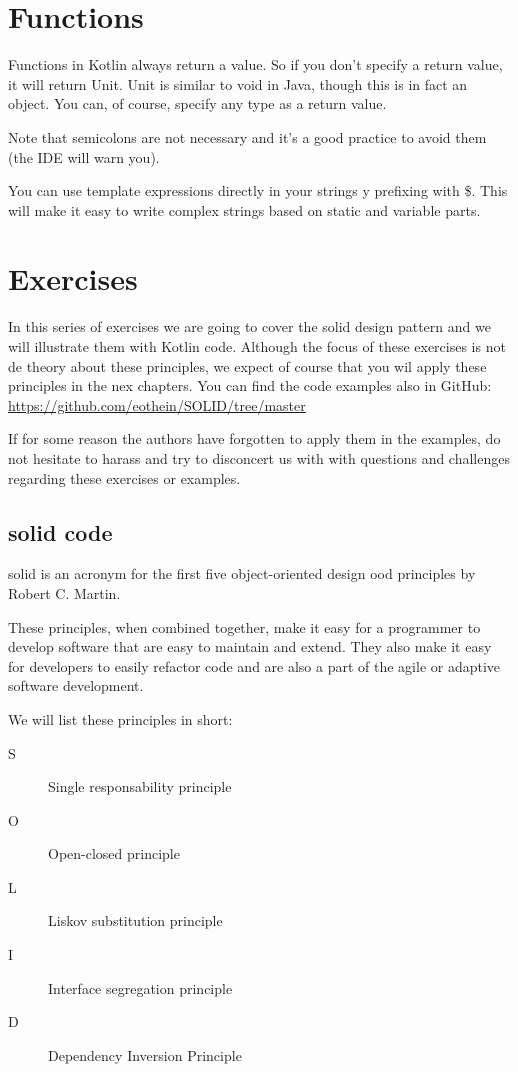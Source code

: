 \section{Functions}
Functions in Kotlin always return a value. So if you don’t specify a return value, it will return Unit.
Unit is similar to void in Java, though this is in fact an object. You can, of course,
specify any type as a return value.

Note that semicolons are not  necessary
and it’s a good practice to avoid them (the IDE will warn you).

You can use template expressions directly in your strings y prefixing with \$. This will make
it easy to write complex strings based on static and variable parts. 

\section{Exercises }
In this series of exercises we are going to cover the \gls{solid} design pattern and we will illustrate them with Kotlin code. Although the focus of these exercises is not de theory about these principles, we expect of course that you wil apply these principles in the nex chapters. You can find the code examples also in GitHub: \url{https://github.com/eothein/SOLID/tree/master}

If for some reason the authors  have forgotten to apply them in the examples, do not hesitate to  harass and try to disconcert us with with questions and challenges regarding these exercises or examples. 


\subsection{\gls{solid} code}
\gls{solid} is an acronym for the first five object-oriented design \gls{ood} principles by Robert C. Martin.

These principles, when combined together, make it easy for a programmer to develop software that are easy to maintain and extend. They also make it easy for developers to easily refactor code and are also a part of the agile or adaptive software development.

We will list these principles in short:

\begin{description}
	\item[S] Single responsability principle
	\item[O] Open-closed principle
	\item[L] Liskov substitution principle
	\item[I] Interface segregation principle
	\item[D] Dependency Inversion Principle
\end{description}

